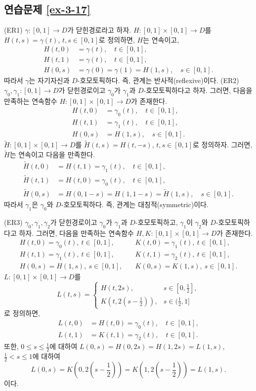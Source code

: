 \subsection*{연습문제 \ref{ex-3-17}}

(ER1)
$\gamma: [0,1] \to D$가 닫힌경로라고 하자.
$H:[0,1]\times[0,1] \to D$를 $H(t,s) = \gamma(t)$, $t,s\in[0,1]$로 정의하면,
$H$는 연속이고,
\begin{align*}
H(t,0) &=\gamma(t), \quad t\in[0,1],\\
H(t,1) &=\gamma(t), \quad t\in[0,1],\\
H(0,s) &=\gamma(0) = \gamma(1) = H(1,s), \quad s\in[0,1].
\end{align*}
따라서 $\gamma$는 자기자신과 $D$-호모토픽하다.
즉, 관계는 반사적(reflexive)이다.
(ER2)
$\gamma_0, \gamma_1: [0,1] \to D$가 닫힌경로이고
$\gamma_0$가 $\gamma_1$과 $D$-호모토픽하다고 하자.
그러면, 다음을 만족하는 연속함수 $H:[0,1]\times[0,1] \to D$가 존재한다.
\begin{align*}
H(t,0) &= \gamma_0(t), \quad t\in [0,1], \\
H(t,1) &= \gamma_1(t), \quad t\in [0,1], \\
H(0,s) &= H(1,s), \quad s\in [0,1].
\end{align*}
$\tilde H:[0,1]\times [0,1] \to D$를
$\tilde H(t,s) = H(t,-s)$, $t,s\in[0,1]$로 정의하자.
그러면, $\tilde H$는 연속이고 다음을 만족한다.
\begin{align*}
\tilde H(t,0) & = H(t,1) = \gamma_1(t), \quad t\in[0,1], \\
\tilde H(t,1) & = H(t,0) = \gamma_0(t), \quad t\in[0,1], \\
\tilde H(0,s) & = H(0,1-s) = H(1,1-s) = \tilde H(1,s), \quad s\in[0,1].
\end{align*}
따라서 $\gamma_1$은 $\gamma_0$와 $D$-호모토픽하다.
즉, 관계는 대칭적(symmetric)이다.

(ER3)
$\gamma_0, \gamma_1, \gamma_2$가 닫힌경로이고
$\gamma_0$가 $\gamma_1$과 $D$-호모토픽하고,
$\gamma_1$이 $\gamma_2$와 $D$-호모토픽하다고 하자.
그러면, 다음을 만족하는 연속함수  $H, K:[0,1]\times[0,1]\to D$가 존재한다.
\begin{align*}
H(t,0) = \gamma_0(t), \ t\in[0,1], \quad & K(t,0) = \gamma_1(t), \ t\in[0,1], \\
H(t,1) = \gamma_1(t), \ t\in[0,1], \quad & K(t,1) = \gamma_2(t), \ t\in[0,1], \\
H(0,s) = H(1,s), \ s\in[0,1], \quad & K(0,s) = K(1,s), \ s\in[0,1].
\end{align*}
$L:[0,1]\times[0,1]\to D$를
\[
L(t,s) = \begin{cases}
H(t,2s), & s\in [0, \frac12], \\
K\left(t, 2(s-\frac12)\right), & s\in (\frac12,1]
\end{cases}
\]
로 정의하면,
\begin{align*}
L(t,0) &= H(t,0) = \gamma_0(t), \quad t\in[0,1],\\
L(t,1) &= K(t,1) = \gamma_2(t), \quad t\in[0,1].
\end{align*}
또한, $0\le s\le \frac12$에 대하여 $L(0,s) = H(0,2s) = H(1,2s) = L(1,s)$, 
$\frac12 <s\le1$에 대하여
\[
L(0,s) = K\left( 0, 2(s - \frac12) \right) = K\left( 1, 2(s - \frac12) \right) = L(1,s).
\]
이다.

